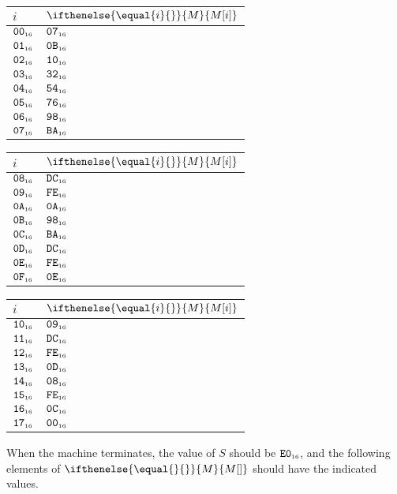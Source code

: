 \documentclass[a4paper,12pt]{article}
\makeatletter
\newcommand{\num}[1]{\texttt{#1}}
\newcommand{\hex}[1]{\num{#1}_{\textup{\tiny 16}}}
\newcommand{\MEM}[1]{\ifthenelse{\equal{#1}{}}{M}{M[#1]}}
\newcommand{\SP}{S}
\newenvironment{memtable}{%
  \begin{trivlist}
    \item
    }{%
    \end{trivlist}}
\newenvironment{memcolumn}{%
  \begin{tabular}{@{}ll@{}}
    $i$ & $\MEM{i}$ \\
    \hline}
    {%
    \hline
  \end{tabular}}
\newcommand{\memspace}{\qquad}
\makeatother
\begin{document}
\begin{memtable}
  \begin{memcolumn}
    $\hex{00}$ & $\hex{07}$ \\
    $\hex{01}$ & $\hex{0B}$ \\
    $\hex{02}$ & $\hex{10}$ \\
    $\hex{03}$ & $\hex{32}$ \\
    $\hex{04}$ & $\hex{54}$ \\
    $\hex{05}$ & $\hex{76}$ \\
    $\hex{06}$ & $\hex{98}$ \\
    $\hex{07}$ & $\hex{BA}$ \\
  \end{memcolumn}
  \memspace
  \begin{memcolumn}
    $\hex{08}$ & $\hex{DC}$ \\
    $\hex{09}$ & $\hex{FE}$ \\
    $\hex{0A}$ & $\hex{0A}$ \\
    $\hex{0B}$ & $\hex{98}$ \\
    $\hex{0C}$ & $\hex{BA}$ \\
    $\hex{0D}$ & $\hex{DC}$ \\
    $\hex{0E}$ & $\hex{FE}$ \\
    $\hex{0F}$ & $\hex{0E}$ \\
  \end{memcolumn}
  \memspace
  \begin{memcolumn}
    $\hex{10}$ & $\hex{09}$ \\
    $\hex{11}$ & $\hex{DC}$ \\
    $\hex{12}$ & $\hex{FE}$ \\
    $\hex{13}$ & $\hex{0D}$ \\
    $\hex{14}$ & $\hex{08}$ \\
    $\hex{15}$ & $\hex{FE}$ \\
    $\hex{16}$ & $\hex{0C}$ \\
    $\hex{17}$ & $\hex{00}$ \\
  \end{memcolumn}
\end{memtable}
When the machine terminates, the value of $\SP$ should be $\hex{E0}$, and the following elements of $\MEM{}$ should have the indicated values.
\end{document}
